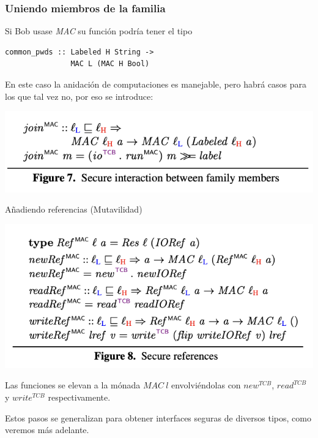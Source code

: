 \documentclass{beamer}
\begin{document}
\begin{frame}[fragile]
    \frametitle{Uniendo miembros de la familia}
    Si Bob usase \textit{MAC} su función podría tener el tipo

    \begin{lstlisting}
common_pwds :: Labeled H String -> 
               MAC L (MAC H Bool)
    \end{lstlisting}
    
    En este caso la anidación de computaciones es manejable, pero habrá casos para los que tal vez no, por eso se introduce:

    \begin{center}
        \includegraphics[scale=0.8]{figure7.png}
    \end{center}
\end{frame}

\begin{frame}{Añadiendo referencias (Mutavilidad)}
    \begin{center}
        \includegraphics[scale=0.7]{figure8.png}
    \end{center}

    Las funciones se elevan a la mónada $MAC \ l$ envolviéndolas con $new^{TCB}$, $read^{TCB}$ y $write^{TCB}$ respectivamente. \pause

    Estos pasos se generalizan para obtener interfaces seguras de diversos tipos, como veremos más adelante.
\end{frame}
\end{document}
